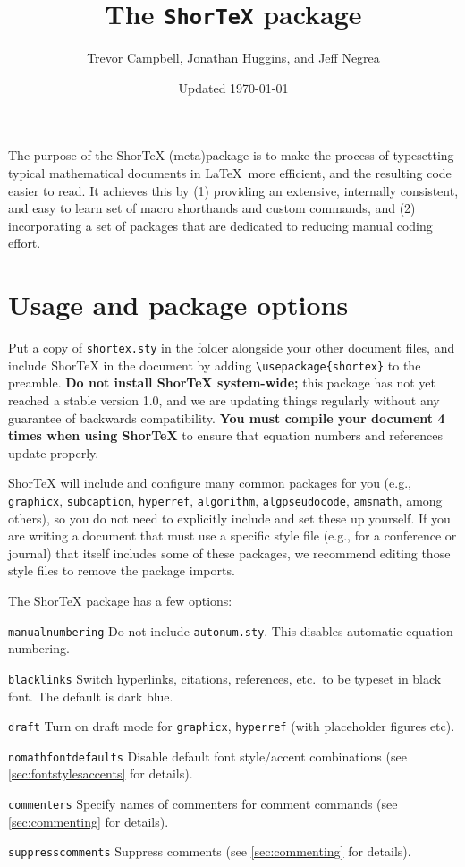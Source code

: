 \documentclass{article}
\title{The \texttt{ShorTeX} package}
\author{Trevor Campbell, Jonathan Huggins, and Jeff Negrea}
\date{Updated \today}
\begin{document}
\maketitle

\babs

The purpose of the ShorTeX (meta)package is to make the process of typesetting
typical mathematical documents in \LaTeX~more efficient, and the resulting
code easier to read.  It achieves this by 
(1) providing an
extensive, internally consistent, and easy to learn set of macro
shorthands and custom commands, and 
(2) incorporating a set of packages that are
dedicated to reducing manual coding effort.
\eabs


\tableofcontents

\section{Usage and package options}\label{sec:usage}

Put a copy of \texttt{shortex.sty} in the folder
alongside your other document files, and
include ShorTeX in the document by adding \verb!\usepackage{shortex}! to the preamble.
\textbf{Do not install ShorTeX system-wide;} this package has not yet reached a stable version 1.0,
and we are updating things regularly without any guarantee of backwards
compatibility. 
\textbf{You must compile your document 4 times when using ShorTeX} to ensure that equation
numbers and references update properly.


ShorTeX will include and configure many common packages for you (e.g., \texttt{graphicx}, \texttt{subcaption}, \texttt{hyperref},
\texttt{algorithm}, \texttt{algpseudocode}, \texttt{amsmath}, among others),
so you do not need to explicitly include and set these up yourself.
If you are writing a document that must use a specific style file (e.g., for a conference or journal) that itself
includes some of these packages, we recommend editing those style files to remove the package imports.

The ShorTeX package has a few options:
\bdesc
\item[\texttt{manualnumbering}] Do not include \texttt{autonum.sty}. This disables automatic equation numbering.
\item[\texttt{blacklinks}] Switch hyperlinks, citations, references, etc.~to be typeset in black font. The default is dark blue.
\item[\texttt{draft}] Turn on draft mode for \texttt{graphicx}, \texttt{hyperref} (with placeholder figures etc).
\item[\texttt{nomathfontdefaults}] Disable default font style/accent combinations (see \cref{sec:fontstylesaccents} for details).
\item[\texttt{commenters}] Specify names of commenters for comment commands (see \cref{sec:commenting} for details).
\item[\texttt{suppresscomments}] Suppress comments (see \cref{sec:commenting} for details).
\edesc
\end{document}
